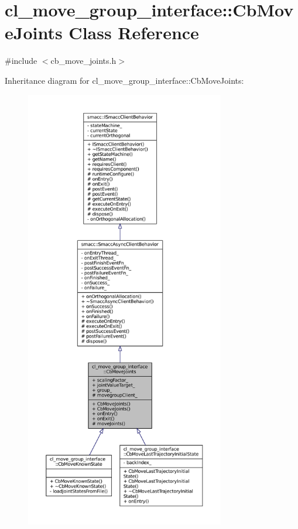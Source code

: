 \hypertarget{classcl__move__group__interface_1_1CbMoveJoints}{}\section{cl\+\_\+move\+\_\+group\+\_\+interface\+:\+:Cb\+Move\+Joints Class Reference}
\label{classcl__move__group__interface_1_1CbMoveJoints}


{\ttfamily \#include $<$cb\+\_\+move\+\_\+joints.\+h$>$}



Inheritance diagram for cl\+\_\+move\+\_\+group\+\_\+interface\+:\+:Cb\+Move\+Joints\+:
\nopagebreak
\begin{figure}[H]
\begin{center}
\leavevmode
\includegraphics[height=550pt]{classcl__move__group__interface_1_1CbMoveJoints__inherit__graph}
\end{center}
\end{figure}


